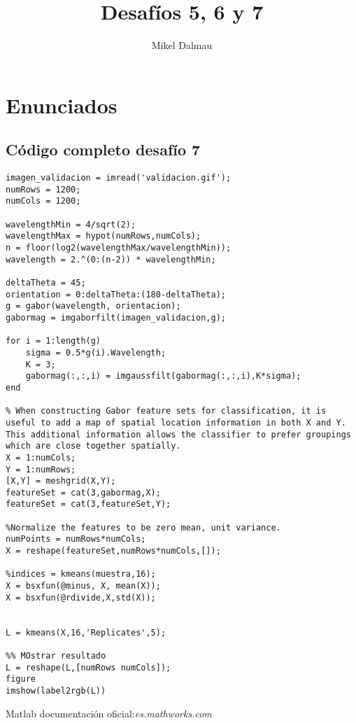 \documentclass[es,gi]{ifirak}\usepackage[]{graphicx}\usepackage[]{color}
\begin{document}
\title{Desafíos 5, 6 y 7}
\author{Mikel Dalmau}

\maketitle




\tableofcontents

\pagebreak
\section{Enunciados}


\pagebreak
\subsection{Código completo desafío 7}
\begin{lstlisting}
imagen_validacion = imread('validacion.gif');
numRows = 1200;
numCols = 1200;

wavelengthMin = 4/sqrt(2);
wavelengthMax = hypot(numRows,numCols);
n = floor(log2(wavelengthMax/wavelengthMin));
wavelength = 2.^(0:(n-2)) * wavelengthMin;

deltaTheta = 45;
orientation = 0:deltaTheta:(180-deltaTheta);
g = gabor(wavelength, orientacion);
gabormag = imgaborfilt(imagen_validacion,g);

for i = 1:length(g)
    sigma = 0.5*g(i).Wavelength;
    K = 3;
    gabormag(:,:,i) = imgaussfilt(gabormag(:,:,i),K*sigma); 
end

% When constructing Gabor feature sets for classification, it is useful to add a map of spatial location information in both X and Y. This additional information allows the classifier to prefer groupings which are close together spatially.
X = 1:numCols;
Y = 1:numRows;
[X,Y] = meshgrid(X,Y);
featureSet = cat(3,gabormag,X);
featureSet = cat(3,featureSet,Y);

%Normalize the features to be zero mean, unit variance.
numPoints = numRows*numCols;
X = reshape(featureSet,numRows*numCols,[]);

%indices = kmeans(muestra,16);
X = bsxfun(@minus, X, mean(X));
X = bsxfun(@rdivide,X,std(X));


L = kmeans(X,16,'Replicates',5);

%% MOstrar resultado
L = reshape(L,[numRows numCols]);
figure
imshow(label2rgb(L))

\end{lstlisting}
\begin{thebibliography}{arauak}
	
	 Matlab documentación oficial:\textit{es.mathworks.com}
	
\end{thebibliography}
\end{document}
